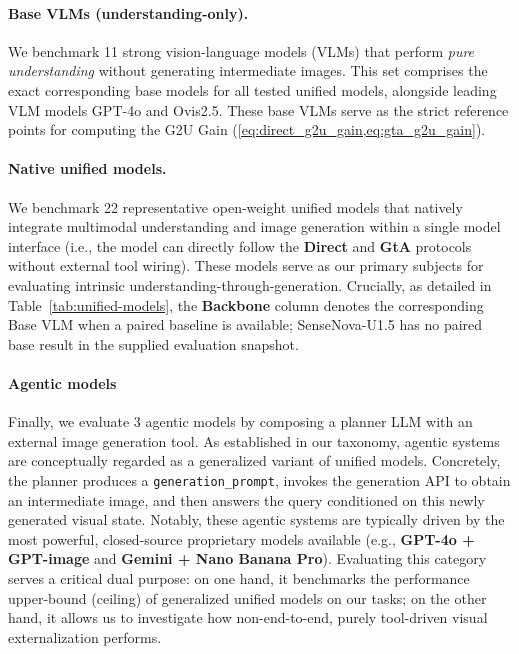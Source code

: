 \documentclass{article}
\theoremstyle{plain}
\theoremstyle{definition}
\theoremstyle{remark}
\begin{document}
\paragraph{Base VLMs (understanding-only).}
We benchmark 11 strong vision-language models (VLMs) that perform \emph{pure understanding} without generating intermediate images. This set comprises the exact corresponding base models for all tested unified models, alongside leading VLM models GPT-4o and Ovis2.5. These base VLMs serve as the strict reference points for computing the G2U Gain (\cref{eq:direct_g2u_gain,eq:gta_g2u_gain}).

\paragraph{Native unified models.}
We benchmark 22 representative open-weight unified models that natively integrate multimodal understanding and image generation within a single model interface (i.e., the model can directly follow the \textbf{Direct} and \textbf{GtA} protocols without external tool wiring). These models serve as our primary subjects for evaluating intrinsic understanding-through-generation. Crucially, as detailed in Table~\ref{tab:unified-models}, the \textbf{Backbone} column denotes the corresponding Base VLM when a paired baseline is available; SenseNova-U1.5 has no paired base result in the supplied evaluation snapshot.

\paragraph{Agentic models }
Finally, we evaluate 3 agentic models by composing a planner LLM with an external image generation tool. As established in our taxonomy, agentic systems are conceptually regarded as a generalized variant of unified models. Concretely, the planner produces a \texttt{generation\_prompt}, invokes the generation API to obtain an intermediate image, and then answers the query conditioned on this newly generated visual state. Notably, these agentic systems are typically driven by the most powerful, closed-source proprietary models available (e.g., \textbf{GPT-4o + GPT-image} and \textbf{Gemini + Nano Banana Pro}). Evaluating this category serves a critical dual purpose: on one hand, it benchmarks the performance upper-bound (ceiling) of generalized unified models on our tasks; on the other hand, it allows us to investigate how non-end-to-end, purely tool-driven visual externalization performs.
\end{document}
